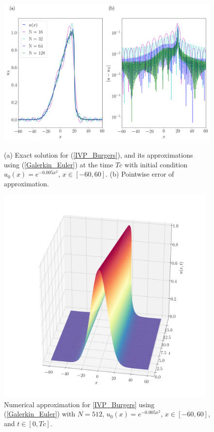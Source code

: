 	\begin{figure}[H]
		\centering	
		\includegraphics[width=13cm]{burgers_equation/deterministic/numerical_experiments/inviscid/figures/Numerical_Solution_Inviscid_T.png}
		\caption{(a) Exact solution for (\ref{IVP_Burgers}), and its approximations using (\ref{Galerkin_Euler}) at the time $Tc$ with initial condition $u_0(x) = e^{-0.005x^2}$, $x \in [-60, 60]$. (b) Pointwise error of approximation.}
		\label{convection_aprox_T}
		\includegraphics[width=11cm]{burgers_equation/deterministic/numerical_experiments/inviscid/figures/Numerical_Solution_Inviscid.png}
		\caption{Numerical approximation for  \ref{IVP_Burgers} using (\ref{Galerkin_Euler}) with $N=512$, $u_0(x) = e^{-0.005x^2}$, $x \in [-60, 60]$, and $t \in [0, Tc]$.}
	\end{figure}
